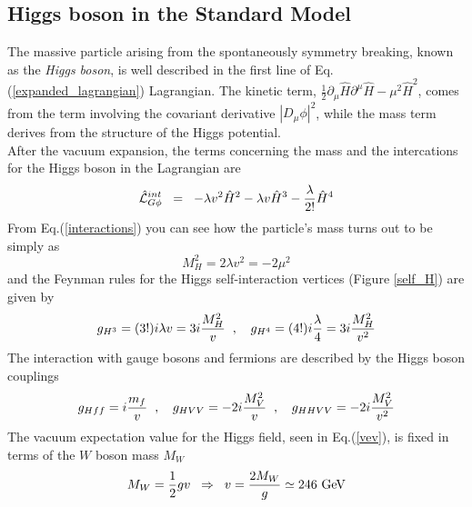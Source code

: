 \subsection{Higgs boson in the Standard Model}
The massive particle arising from the spontaneously symmetry breaking, known as the \emph{Higgs boson}\cite{PhysRevLett.13.321, PhysRevLett.13.508}, is well described in the first line of Eq.(\ref{expanded_lagrangian}) Lagrangian. The kinetic term, $\frac{1}{2}\partial_{\mu}\hat{H}\partial^{\mu}\hat{H}-\mu^2\hat{H}^2$, comes from the term involving the covariant derivative $|D_{\mu}\phi|^2$, while the mass term derives from the structure of the Higgs potential.
\\
After the vacuum expansion, the terms concerning the mass and the intercations for the Higgs boson in the Lagrangian are
\begin{equation}
\hat{\mathcal{L}}^{int}_{G\phi} \hspace{0.2cm} = \hspace{0.2cm} -\lambda v^2\hat{H}^2 -\lambda v\hat{H}^3 -\frac{\lambda}{2!}\hat{H}^4 
\label{interactions}
\end{equation}
From Eq.(\ref{interactions}) you can see how the particle's mass turns out to be simply as 
\begin{equation}
M_H^2 = 2\lambda v^2 = -2\mu^2
\end{equation}
and the Feynman rules for the Higgs self-interaction vertices (Figure \ref{self_H}) are given by
\begin{equation}
g_{H^3} = (3!)i\lambda v = 3i\frac{M_H^2}{v} \hspace{0.2cm} \text{,} \hspace{0.4cm} g_{H^4} = (4!)i\frac{\lambda}{4} = 3i\frac{M_H^2}{v^2}
\end{equation}
The interaction with gauge bosons and fermions are described by the Higgs boson couplings
\begin{equation}
g_{Hff} = i\frac{m_f}{v} \hspace{0.2cm} \text{,} \hspace{0.4cm} g_{HVV} = -2i\frac{M_V^2}{v} \hspace{0.2cm} \text{,} \hspace{0.4cm} g_{HHVV} = -2i\frac{M_V^2}{v^2}
\end{equation}
The vacuum expectation value for the Higgs field, seen in Eq.(\ref{vev}), is fixed in terms of the $W$ boson mass $M_W$
\begin{equation}
M_W = \frac{1}{2}gv \hspace{0.2cm} \Rightarrow \hspace{0.2cm} v = \frac{2M_W}{g} \simeq \text{246 GeV}
\end{equation}
